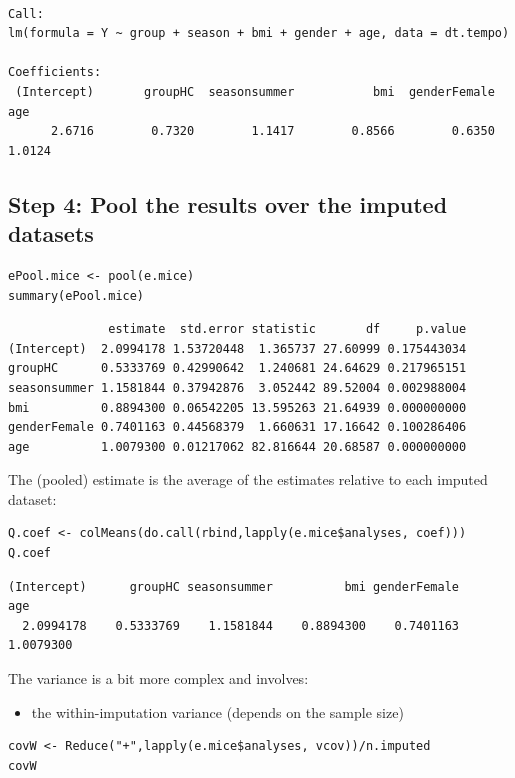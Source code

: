 \documentclass[12pt]{article}
\begin{document}
\begin{verbatim}

Call:
lm(formula = Y ~ group + season + bmi + gender + age, data = dt.tempo)

Coefficients:
 (Intercept)       groupHC  seasonsummer           bmi  genderFemale           age  
      2.6716        0.7320        1.1417        0.8566        0.6350        1.0124
\end{verbatim}

\clearpage

\subsection{Step 4: Pool the results over the imputed datasets}
\label{sec:org4929b21}

\lstset{language=r,label= ,caption= ,captionpos=b,numbers=none}
\begin{lstlisting}
ePool.mice <- pool(e.mice)
summary(ePool.mice)
\end{lstlisting}

\begin{verbatim}
              estimate  std.error statistic       df     p.value
(Intercept)  2.0994178 1.53720448  1.365737 27.60999 0.175443034
groupHC      0.5333769 0.42990642  1.240681 24.64629 0.217965151
seasonsummer 1.1581844 0.37942876  3.052442 89.52004 0.002988004
bmi          0.8894300 0.06542205 13.595263 21.64939 0.000000000
genderFemale 0.7401163 0.44568379  1.660631 17.16642 0.100286406
age          1.0079300 0.01217062 82.816644 20.68587 0.000000000
\end{verbatim}


The (pooled) estimate is the average of the estimates relative to each
imputed dataset:
\lstset{language=r,label= ,caption= ,captionpos=b,numbers=none}
\begin{lstlisting}
Q.coef <- colMeans(do.call(rbind,lapply(e.mice$analyses, coef)))
Q.coef
\end{lstlisting}

\begin{verbatim}
(Intercept)      groupHC seasonsummer          bmi genderFemale          age 
  2.0994178    0.5333769    1.1581844    0.8894300    0.7401163    1.0079300
\end{verbatim}

The variance is a bit more complex and involves:
\begin{itemize}
\item the within-imputation variance (depends on the sample size)
\end{itemize}
\lstset{language=r,label= ,caption= ,captionpos=b,numbers=none}
\begin{lstlisting}
covW <- Reduce("+",lapply(e.mice$analyses, vcov))/n.imputed
covW
\end{lstlisting}
\end{document}
